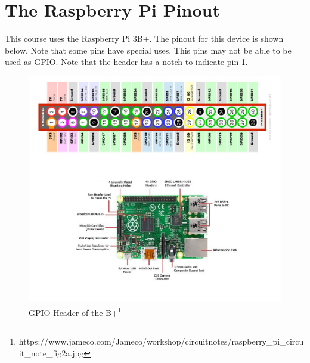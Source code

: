 \section{The Raspberry Pi Pinout}
This course uses the Raspberry Pi 3B+. The pinout for this device is shown below. Note that some pins have special uses. This pins may not be able to be used as GPIO. Note that the header has a notch to indicate pin 1.  

\begin{figure}[H]
\centering
\includegraphics[width=1\columnwidth]{Figures/pinout}
\caption{GPIO Header of the B+\footnote{https://www.jameco.com/Jameco/workshop/circuitnotes/raspberry_pi_circuit_note_fig2a.jpg}}
\label{fig:pinout}
\end{figure}